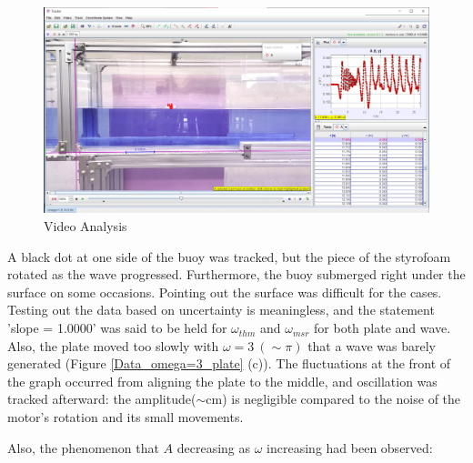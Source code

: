 \begin{figure}[H]
    \centering
    \includegraphics[width=\textwidth]{images/Experiment(Wave_Tracker, omega=1.0, A=2).jpg}
    \caption{Video Analysis}
    \label{Tracker}
\end{figure}

A black dot at one side of the buoy was tracked, but the piece of the styrofoam rotated as the wave progressed. Furthermore, the buoy submerged right under the surface on some occasions. Pointing out the surface was difficult for the cases. Testing out the data based on uncertainty is meaningless, and the statement 'slope = 1.0000' was said to be held for $\omega_{thm}$ and $\omega_{msr}$ for both plate and wave. Also, the plate moved too slowly with $\omega=3~(\sim \pi)$ that a wave was barely generated (Figure \ref{Data_omega=3_plate} (c)). The fluctuations at the front of the graph occurred from aligning the plate to the middle, and oscillation was tracked afterward: the amplitude($\sim \mathrm{cm}$) is negligible compared to the noise of the motor's rotation and its small movements.

Also, the phenomenon that $A$ decreasing as $\omega$ increasing had been observed:

